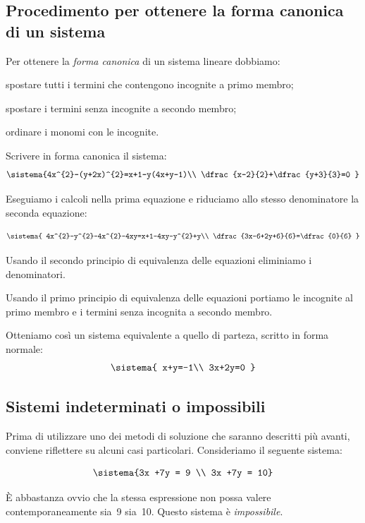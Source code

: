 \subsection{Procedimento per ottenere la forma canonica di un sistema}
Per ottenere la \emph{forma canonica} di un sistema lineare dobbiamo:
\begin{enumerate*}
 \item spostare tutti i termini che contengono incognite a primo membro;
 \item spostare i termini senza incognite a secondo membro;
 \item ordinare i monomi con le incognite.
\end{enumerate*}
 \begin{esempio}{}{}
 Scrivere in forma canonica il sistema:
\[\sistema{4x^{2}-(y+2x)^{2}=x+1-y(4x+y-1)\\
\dfrac{x-2}{2}+\dfrac{y+3}{3}=0
}\]

Eseguiamo i calcoli nella prima equazione e riduciamo allo stesso
denominatore la seconda equazione:

\[\sistema{
 4x^{2}-y^{2}-4x^{2}-4xy=x+1-4xy-y^{2}+y\\
 \dfrac{3x-6+2y+6}{6}=\dfrac{0}{6}
 }\]

Usando il secondo principio di equivalenza delle equazioni eliminiamo i 
denominatori.

Usando il primo principio di equivalenza delle equazioni portiamo le
incognite al primo membro e i termini senza incognita a secondo membro.

Otteniamo così un sistema equivalente a quello di parteza, scritto in forma 
normale:
 \[\sistema{
   x+y=-1\\
   3x+2y=0
}\]
 \end{esempio}

\subsection{Sistemi indeterminati o impossibili}
 
Prima di utilizzare uno dei metodi di soluzione che saranno descritti più 
avanti, conviene riflettere su alcuni casi particolari. Consideriamo il 
seguente sistema:

\[\sistema{3x +7y = 9 \\ 3x +7y = 10}\]

È abbastanza ovvio che la stessa espressione non possa valere 
contemporaneamente sia~9 sia~10. Questo sistema è \emph{impossibile}.

